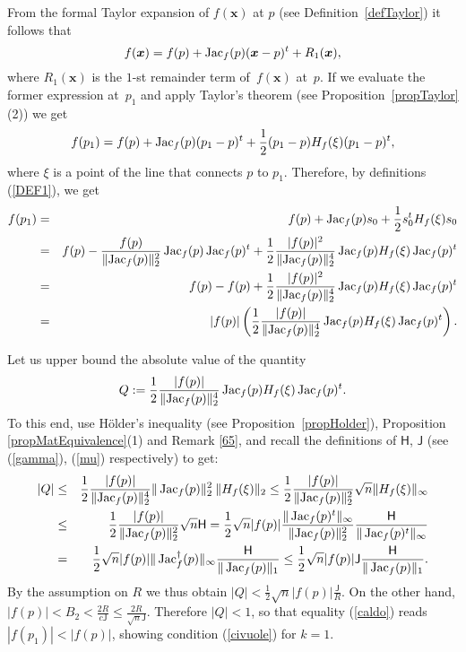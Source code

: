 \documentclass[10pt]{article}
\newcommand{\x}{{\bm x}}
\def\Jac{\mathop{\rm Jac}\nolimits}
\begin{document}
From the formal Taylor expansion of $f(\x)$ at $p$ (see 
Definition~\ref{defTaylor}) it follows that
$$
f(\x) = f(p) + \Jac_f(p) (\x-p)^t + R_1(\x),
$$
where $R_1(\bm x)$ is the $1$-st remainder term of~$f(\x)$ at~$p$.
If we evaluate the former expression at~$p_1$ and apply 
Taylor's theorem (see Proposition~\ref{propTaylor}(2)) we get
\begin{eqnarray*}
f(p_1) = f(p) + \Jac_f(p) (p_1-p)^t + 
\frac{1}{2}(p_1-p)H_f(\xi) (p_1-p)^t,
\end{eqnarray*}
 where $\xi$ is a point of the line that connects $p$ to $p_1$.
Therefore,  by definitions (\ref{DEF1}), we get
\begin{eqnarray}\label{caldo} \nonumber
f(p_1)  &=&  f(p) + \Jac_f(p) s_0 +  \frac{1}{2} s_0^t H_f(\xi) s_0\\ \nonumber
&=&  f(p) - \frac{f(p)}{\|{\rm Jac}_f(p)\|_2^2} \Jac_f(p)  \Jac_f(p)^t +  
\frac{1}{2} \frac{|f(p)|^2}{\|{\rm Jac}_f(p)\|_2^4} \Jac_f(p) H_f(\xi) \Jac_f(p)^t\\ \nonumber
&=& f(p) - f(p) +  
\frac{1}{2} \frac{|f(p)|^2}{\|{\rm Jac}_f(p)\|_2^4} \Jac_f(p) H_f(\xi) \Jac_f(p)^t\\ 
&=&  |f(p)| \left ( 
\frac{1}{2} \frac{|f(p)|}{\|{\rm Jac}_f(p)\|_2^4} \Jac_f(p) H_f(\xi) \Jac_f(p)^t \right ).
\end{eqnarray}

Let us upper bound the absolute value of the quantity
$$Q:= \frac{1}{2} \frac{|f(p)|}{\|{\rm Jac}_f(p)\|_2^4} \Jac_f(p) H_f(\xi) \Jac_f(p)^t. $$
To this end, use   H\"older's inequality (see Proposition~\ref{propHolder}), Proposition  \ref{propMatEquivalence}(1) 
and Remark \ref{65},
 and recall   the definitions of ${\mathsf H}$, $\mathsf J$ (see (\ref{gamma}),  (\ref{mu}) respectively) to get:
\begin{eqnarray*}
|Q| &\le & \frac{1}{2} \frac{|f(p)|}{\|{\rm Jac}_f(p)\|_2^4}  \| \Jac_f(p)\|_2^2 \: \|H_f(\xi)\|_2
\le  \frac{1}{2} \frac{|f(p)|}{\|{\rm Jac}_f(p)\|_2^2}  \sqrt{n} \|H_f(\xi)\|_\infty\\
&\le & \frac{1}{2} \frac{ |f(p)|}{\|{\rm Jac}_f(p)\|_2^2} \sqrt{n} {\mathsf H} =
 \frac{1}{2} \sqrt{n}|f(p)| \frac{\|\Jac_f(p)^t\|_\infty}{\|{\rm Jac}_f(p)\|_2^2}  
 \frac{\mathsf H}{\|\Jac_f(p)^t\|_\infty} \\
 &=& \frac{1}{2} \sqrt{n}|f(p)| \|\Jac_f^\dagger(p)\|_\infty  \frac{{\mathsf H}}{\|\Jac_f(p)\|_1}   
\le  \frac{1}{2} \sqrt{n}|f(p)| \mathsf J  \frac{{\mathsf H}}{\|\Jac_f(p)\|_1}.    
\end{eqnarray*}
By the assumption on $R$   we thus obtain
$|Q|< \frac{1}{2} \sqrt{n}|f(p)| \frac{\mathsf J}{R}$.
On the other hand,  $|f(p)| < B_2 < \frac{2R}{c \mathsf J} \le  \frac{2R}{\sqrt{n} \mathsf J}$.
 Therefore  $|Q|<1$,  so that equality (\ref{caldo}) reads $|f(p_1)| <  |f(p)|$, 
   showing condition  (\ref{civuole}) for $k=1$.
   \smallskip
 
\end{document}
